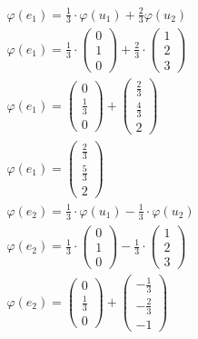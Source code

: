 \begin{align*}
    \varphi(e_1) = \frac{1}{3} \cdot \varphi(u_1) + \frac{2}{3} \varphi(u_2) \\
    \varphi(e_1) = \frac{1}{3} \cdot \begin{pmatrix}
        0 \\ 1 \\ 0
    \end{pmatrix} + \frac{2}{3} \cdot \begin{pmatrix}
        1 \\ 2 \\ 3
    \end{pmatrix} \\
    \varphi(e_1) = \begin{pmatrix}
        0 \\ \frac{1}{3} \\ 0
    \end{pmatrix} + \begin{pmatrix}
        \frac{2}{3} \\ \frac{4}{3} \\ 2
    \end{pmatrix} \\
    \varphi(e_1) = \begin{pmatrix}
        \frac{2}{3} \\ \frac{5}{3} \\ 2 
    \end{pmatrix}\\
    \varphi(e_2) = \frac{1}{3} \cdot \varphi(u_1) - \frac{1}{3} \cdot \varphi(u_2) \\
    \varphi(e_2) = \frac{1}{3} \cdot \begin{pmatrix}
        0 \\ 1 \\ 0
    \end{pmatrix} -\frac{1}{3} \cdot \begin{pmatrix}
        1 \\ 2 \\ 3
    \end{pmatrix} \\
    \varphi(e_2) = \begin{pmatrix}
        0 \\ \frac{1}{3} \\ 0
    \end{pmatrix} + \begin{pmatrix}
        -\frac{1}{3} \\ -\frac{2}{3} \\ -1
    \end{pmatrix} \\

\end{align*}
